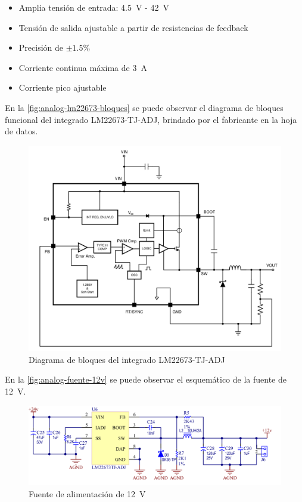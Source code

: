 \documentclass[../et.tex]{subfiles}
\begin{document}
  \begin{itemize}
    \item Amplia tensión de entrada: \SI{4.5}{V} - \SI{42}{V}
    \item Tensión de salida ajustable a partir de resistencias de feedback
    \item Precisión de $\pm 1.5 \%$
    \item Corriente continua máxima de \SI{3}{A}
    \item Corriente pico ajustable
  \end{itemize}

  En la \autoref{fig:analog-lm22673-bloques} se puede observar el diagrama de bloques funcional del integrado LM22673-TJ-ADJ, brindado por el fabricante en la hoja de datos.

  \begin{figure}[!htbp]
    \centering
    \includegraphics[scale=0.5]{../images/analog-lm22673-bloques}
    \caption{Diagrama de bloques del integrado LM22673-TJ-ADJ}
    \label{fig:analog-lm22673-bloques}
  \end{figure}

  En la \autoref{fig:analog-fuente-12v} se puede observar el esquemático de la fuente de \SI{12}{V}.

  \begin{figure}[!htbp]
    \centering
    \includegraphics[scale=0.55]{../images/analog-fuente-12v}
    \caption{Fuente de alimentación de \SI{12}{V}}
    \label{fig:analog-fuente-12v}
  \end{figure}
\end{document}
